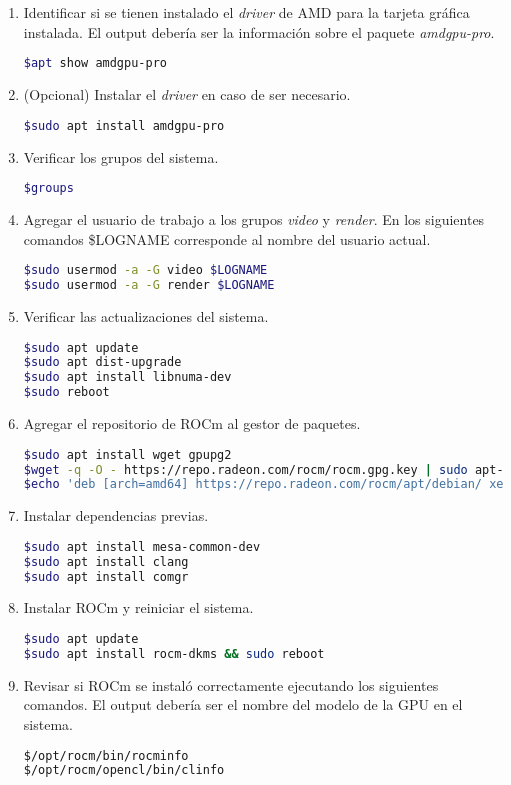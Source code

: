 \begin{enumerate}
\item Identificar si se tienen instalado el \textit{driver} de AMD para la tarjeta gráfica instalada. 
El output debería ser la información sobre el paquete \textit{amdgpu-pro}.
\begin{lstlisting}[language=bash]
$apt show amdgpu-pro
\end{lstlisting}
\item (Opcional) Instalar el \textit{driver} en caso de ser necesario.
\begin{lstlisting}[language=bash]
$sudo apt install amdgpu-pro
\end{lstlisting}

\item Verificar los grupos del sistema.
\begin{lstlisting}[language=bash]
$groups
\end{lstlisting}

\item Agregar el usuario de trabajo a los grupos \textit{video} y \textit{render}.
En los siguientes comandos \$LOGNAME corresponde al nombre del usuario actual.
\begin{lstlisting}[language=bash]
$sudo usermod -a -G video $LOGNAME
$sudo usermod -a -G render $LOGNAME
\end{lstlisting}

\item Verificar las actualizaciones del sistema.
\begin{lstlisting}[language=bash]
$sudo apt update
$sudo apt dist-upgrade
$sudo apt install libnuma-dev
$sudo reboot
\end{lstlisting}
\item Agregar el repositorio de ROCm al gestor de paquetes.
\begin{lstlisting}[language=bash, breaklines=true]
$sudo apt install wget gpupg2
$wget -q -O - https://repo.radeon.com/rocm/rocm.gpg.key | sudo apt-key add -
$echo 'deb [arch=amd64] https://repo.radeon.com/rocm/apt/debian/ xenial main' | sudo tee /etc/apt/sources.list.d/rocm.list
\end{lstlisting}


\item Instalar dependencias previas.
\begin{lstlisting}[language=bash]
$sudo apt install mesa-common-dev
$sudo apt install clang
$sudo apt install comgr
\end{lstlisting}

\item Instalar ROCm y reiniciar el sistema.
\begin{lstlisting}[language=bash]
$sudo apt update
$sudo apt install rocm-dkms && sudo reboot
\end{lstlisting}
\item Revisar si ROCm se instaló correctamente ejecutando los siguientes comandos.
El output debería ser el nombre del modelo de la GPU en el sistema.
\begin{lstlisting}[language=bash]
$/opt/rocm/bin/rocminfo
$/opt/rocm/opencl/bin/clinfo
\end{lstlisting}


\end{enumerate}
